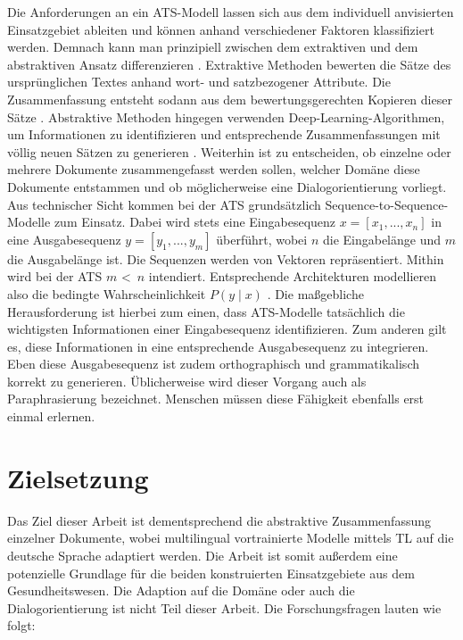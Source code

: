 \noindent
Die Anforderungen an ein \ac{ATS}-Modell lassen sich aus dem individuell anvisierten Einsatzgebiet ableiten und können anhand verschiedener Faktoren klassifiziert werden. Demnach kann man prinzipiell zwischen dem extraktiven und dem abstraktiven Ansatz differenzieren \cite[S.~5]{GAM16}. Extraktive Methoden bewerten die Sätze des ursprünglichen Textes anhand wort- und satzbezogener Attribute. Die Zusammenfassung entsteht sodann aus dem bewertungsgerechten Kopieren dieser Sätze \cite[S.~205-207]{KIA17}. Abstraktive Methoden hingegen verwenden Deep-Learning-Algorithmen, um Informationen zu identifizieren und entsprechende Zusammenfassungen mit völlig neuen Sätzen zu generieren \cite[S.~1]{NIT19}. Weiterhin ist zu entscheiden, ob einzelne oder mehrere Dokumente zusammengefasst werden sollen, welcher Domäne diese Dokumente entstammen und ob möglicherweise eine Dialogorientierung vorliegt.\\

\noindent
Aus technischer Sicht kommen bei der \ac{ATS} grundsätzlich Sequence-to-Sequence-Modelle zum Einsatz. Dabei wird stets eine Eingabesequenz $x = [x_{1}, ..., x_{n}]$ in eine Ausgabesequenz $y = [y_{1}, ..., y_{m}]$ überführt, wobei $n$ die Eingabelänge und $m$ die Ausgabelänge ist. Die Sequenzen werden von Vektoren repräsentiert. Mithin wird bei der \ac{ATS} $m$ \textless \, $n$ intendiert. Entsprechende Architekturen modellieren also die bedingte Wahrscheinlichkeit $P(y \mid x)$ \cite[S.~32-33]{NIT19}. Die maßgebliche Herausforderung ist hierbei zum einen, dass \ac{ATS}-Modelle tatsächlich die wichtigsten Informationen einer Eingabesequenz identifizieren. Zum anderen gilt es, diese Informationen in eine entsprechende Ausgabesequenz zu integrieren. Eben diese Ausgabesequenz ist zudem orthographisch und grammatikalisch korrekt zu generieren. Üblicherweise wird dieser Vorgang auch als Paraphrasierung bezeichnet. Menschen müssen diese Fähigkeit ebenfalls erst einmal erlernen.


\section{Zielsetzung}
\noindent
Das Ziel dieser Arbeit ist dementsprechend die abstraktive Zusammenfassung einzelner Dokumente, wobei multilingual vortrainierte Modelle mittels \ac{TL} auf die deutsche Sprache adaptiert werden. Die Arbeit ist somit außerdem eine potenzielle Grundlage für die beiden konstruierten Einsatzgebiete aus dem Gesundheitswesen. Die Adaption auf die Domäne oder auch die Dialogorientierung ist nicht Teil dieser Arbeit. Die Forschungsfragen lauten wie folgt:

